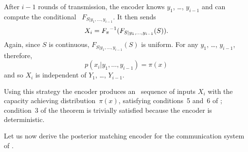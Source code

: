 After $i-1$ rounds of transmission, the encoder knows $y_1$, \ldots, $y_{i-1}$
and can compute the conditional \cdf\ $F_{S|y_1, \ldots, y_{i-1}}$. It then
sends
\begin{equation}
  \label{eq:posteriorxi}
  X_i = {F_{\pi}}^{-1}(F_{S|y_1,\dots,y_{i-1}}(S)).
\end{equation}
Again, since $S$ is continuous, $F_{S|y_1, \dots, y_{i-1}}(S)$ is uniform. For
any $y_1$, \ldots, $y_{i-1}$, therefore, \begin{equation*}
  p(x_i|y_1, \dots, y_{i-1}) = \pi(x)
\end{equation*}
and so $X_i$ is independent of $Y_1$, \ldots, $Y_{i-1}$. 

Using this strategy the encoder produces an \iid\ sequence of inputs $X_i$
with the capacity achieving distribution~$\pi(x)$, satisfying conditions~5
and~6 of ; condition~3 of the theorem is
trivially satisfied because the encoder is deterministic.

Let us now derive the posterior matching encoder for the communication system of
.

